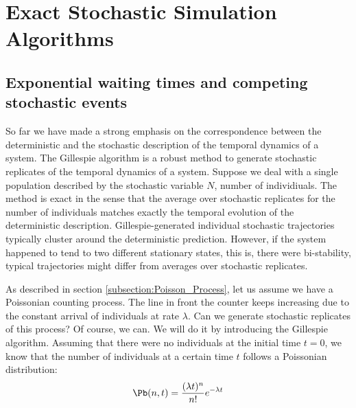 \section{Exact Stochastic Simulation Algorithms}

\subsection{Exponential waiting times and competing stochastic events}
So far we have made a strong emphasis on the correspondence between the deterministic and the stochastic description of the temporal dynamics of a system. The Gillespie algorithm is a robust method to generate stochastic replicates of the temporal dynamics of a system. Suppose we deal with a single population described by the stochastic variable $N$, number of individiuals. The method is exact in the sense that the average over stochastic replicates for the number of individuals matches exactly the temporal evolution of the deterministic description. Gillespie-generated individual stochastic trajectories typically cluster around the deterministic prediction. However, if the system happened to tend to two different stationary states, this is, there were bi-stability, typical trajectories might differ from averages over stochastic replicates.  
\smallskip

As described in section \ref{subsection:Poisson_Process}, let us assume we have a Poissonian counting process. The line in front the counter keeps increasing due to the constant arrival of individuals at rate $\lambda$. Can we generate stochastic replicates of this process? Of course, we can. We will do it by introducing the Gillespie algorithm. Assuming that there were no individuals at the initial time $t=0$, we know that the number of individuals at a certain time $t$ follows a Poissonian distribution:
\begin{equation}
\Pb(n, t) =  \frac{(\lambda t)^n}{n!} e^{-\lambda t}
\label{Poisson_Distribution}
\end{equation}

